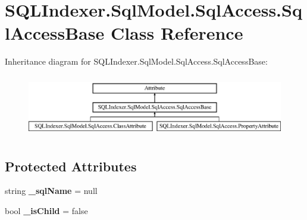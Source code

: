 \hypertarget{class_s_q_l_indexer_1_1_sql_model_1_1_sql_access_1_1_sql_access_base}{\section{S\-Q\-L\-Indexer.\-Sql\-Model.\-Sql\-Access.\-Sql\-Access\-Base Class Reference}
\label{class_s_q_l_indexer_1_1_sql_model_1_1_sql_access_1_1_sql_access_base}
}
Inheritance diagram for S\-Q\-L\-Indexer.\-Sql\-Model.\-Sql\-Access.\-Sql\-Access\-Base\-:\begin{figure}[H]
\begin{center}
\leavevmode
\includegraphics[height=2.745098cm]{class_s_q_l_indexer_1_1_sql_model_1_1_sql_access_1_1_sql_access_base}
\end{center}
\end{figure}
\subsection*{Protected Attributes}
\begin{DoxyCompactItemize}
\item 
\hypertarget{class_s_q_l_indexer_1_1_sql_model_1_1_sql_access_1_1_sql_access_base_a5cd88d381852f1b9c58ffeb68bf83be9}{string {\bfseries \-\_\-sql\-Name} = null}\label{class_s_q_l_indexer_1_1_sql_model_1_1_sql_access_1_1_sql_access_base_a5cd88d381852f1b9c58ffeb68bf83be9}

\item 
\hypertarget{class_s_q_l_indexer_1_1_sql_model_1_1_sql_access_1_1_sql_access_base_adbd8b085d463d4080e8e4486660a84c6}{bool {\bfseries \-\_\-is\-Child} = false}\label{class_s_q_l_indexer_1_1_sql_model_1_1_sql_access_1_1_sql_access_base_adbd8b085d463d4080e8e4486660a84c6}

\end{DoxyCompactItemize}
